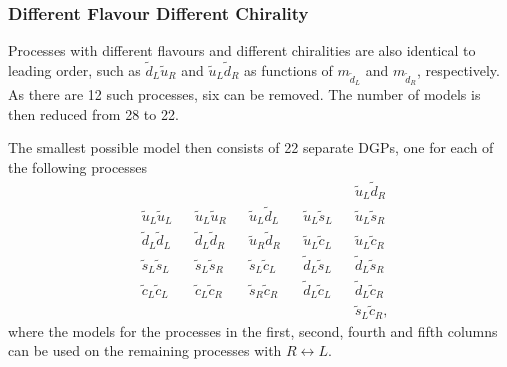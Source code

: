 \documentclass[twoside,english]{uiofysmaster}
\begin{document}
{\subsubsection{Different Flavour Different Chirality}

Processes with different flavours and different chiralities are also identical to leading order, such as $\widetilde{d}_L \widetilde{u}_R$ and $\widetilde{u}_L \widetilde{d}_R$ as functions of $m_{\widetilde{d}_L}$ and $m_{\widetilde{d}_R}$, respectively. As there are 12 such processes, six can be removed. The number of models is then reduced from 28 to 22. 

The smallest possible model then consists of 22 separate DGPs, one for each of the following processes
\begin{align*}
& && && && && \widetilde{u}_L \widetilde{d}_R\\ 
& \widetilde{u}_L \widetilde{u}_L && \widetilde{u}_L \widetilde{u}_R && \widetilde{u}_L \widetilde{d}_L && \widetilde{u}_L \widetilde{s}_L && \widetilde{u}_L \widetilde{s}_R\\
& \widetilde{d}_L \widetilde{d}_L && \widetilde{d}_L \widetilde{d}_R && \widetilde{u}_R \widetilde{d}_R && \widetilde{u}_L \widetilde{c}_L && \widetilde{u}_L \widetilde{c}_R\\ 
& \widetilde{s}_L \widetilde{s}_L && \widetilde{s}_L \widetilde{s}_R && \widetilde{s}_L \widetilde{c}_L && \widetilde{d}_L \widetilde{s}_L && \widetilde{d}_L \widetilde{s}_R\\
& \widetilde{c}_L \widetilde{c}_L && \widetilde{c}_L \widetilde{c}_R && \widetilde{s}_R \widetilde{c}_R && \widetilde{d}_L \widetilde{c}_L && \widetilde{d}_L \widetilde{c}_R \\
&  &&  &&  && && \widetilde{s}_L \widetilde{c}_R,
\end{align*}
where the models for the processes in the first, second, fourth and fifth columns can be used on the remaining processes with $R \leftrightarrow L$.




}
\end{document}
